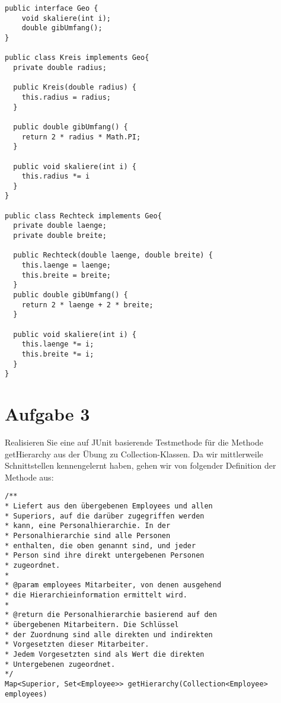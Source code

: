 \begin{lstlisting}
public interface Geo {
    void skaliere(int i);
    double gibUmfang();
}

public class Kreis implements Geo{
  private double radius;

  public Kreis(double radius) {
    this.radius = radius;
  }

  public double gibUmfang() {
    return 2 * radius * Math.PI;
  }

  public void skaliere(int i) {
    this.radius *= i
  } 
}

public class Rechteck implements Geo{
  private double laenge;
  private double breite;

  public Rechteck(double laenge, double breite) {
    this.laenge = laenge;
    this.breite = breite;
  }
  public double gibUmfang() {
    return 2 * laenge + 2 * breite;
  }

  public void skaliere(int i) {
    this.laenge *= i;
    this.breite *= i;
  }
}
\end{lstlisting}

\section{Aufgabe 3}
Realisieren Sie eine auf JUnit basierende Testmethode für die Methode
getHierarchy aus der Übung zu Collection-Klassen. Da wir mittlerweile
Schnittstellen kennengelernt haben, gehen wir von folgender Definition der
Methode aus:

\begin{lstlisting}
/**
* Liefert aus den übergebenen Employees und allen 
* Superiors, auf die darüber zugegriffen werden 
* kann, eine Personalhierarchie. In der 
* Personalhierarchie sind alle Personen 
* enthalten, die oben genannt sind, und jeder 
* Person sind ihre direkt untergebenen Personen  
* zugeordnet.
*
* @param employees Mitarbeiter, von denen ausgehend 
* die Hierarchieinformation ermittelt wird.
*
* @return die Personalhierarchie basierend auf den 
* übergebenen Mitarbeitern. Die Schlüssel
* der Zuordnung sind alle direkten und indirekten 
* Vorgesetzten dieser Mitarbeiter.
* Jedem Vorgesetzten sind als Wert die direkten 
* Untergebenen zugeordnet.
*/
Map<Superior, Set<Employee>> getHierarchy(Collection<Employee> employees)
\end{lstlisting}

\pagebreak


